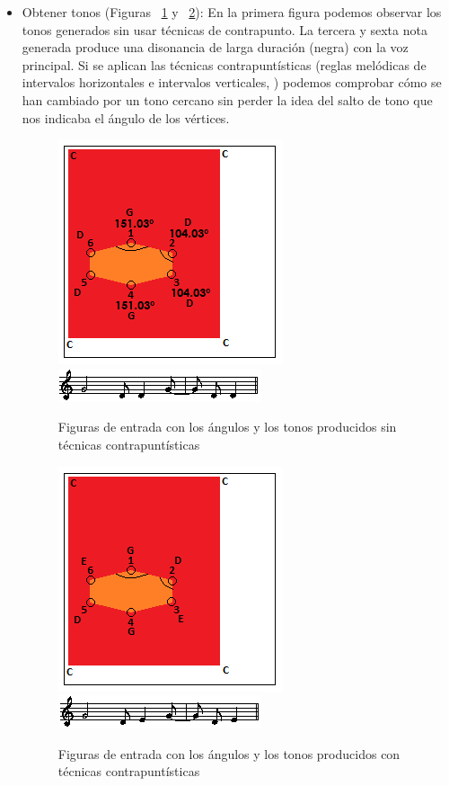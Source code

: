 \begin{itemize}
	\item Obtener tonos (Figuras ~\ref{fig:Figura3Voz2} y ~\ref{fig:Figura4Voz2}): En la primera figura podemos observar los tonos generados sin usar técnicas de contrapunto. La tercera y sexta nota generada produce una disonancia de larga duración (negra) con la voz principal. \color{blue} Si se aplican las técnicas contrapuntísticas (reglas melódicas de intervalos horizontales e intervalos verticales, \cite{Contrapunto}) podemos comprobar cómo se han cambiado por un tono cercano sin perder la idea del salto de tono que nos indicaba el ángulo de los vértices. \color{black}

		\begin{figure}[!htbp]
		\centering
		\hspace*{0.0in}
		\includegraphics[scale=1]{graphics/simpletest4-F3.png}
		\includegraphics[scale=1]{graphics/simpletest4-F3-MEL2partitura.png}
		\caption{Figuras de entrada con los ángulos y los tonos producidos sin técnicas contrapuntísticas}
		\label{fig:Figura3Voz2}
		\end{figure}

		\begin{figure}[!htbp]
		\centering
		\hspace*{0.0in}
		\includegraphics[scale=1]{graphics/simpletest4-F3_2.png}
		\includegraphics[scale=1]{graphics/simpletest4-F3_2-MEL2partitura.png}
		\caption{Figuras de entrada con los ángulos y los tonos producidos con técnicas contrapuntísticas}
		\label{fig:Figura4Voz2}
		\end{figure}


\end{itemize}
